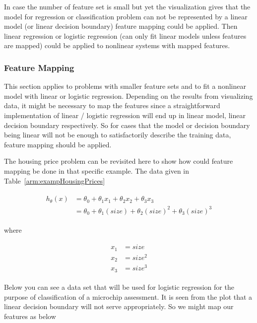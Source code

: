 In case the number of feature set is small but yet the visualization gives that the model for regression or classification problem can not be represented by a linear model (or linear decision boundary) feature mapping could be applied. 
Then linear regression or logistic regression (can only fit linear models unless features are mapped) could be applied to nonlinear systems with mapped features.  

\subsubsection{Feature Mapping}

This section applies to problems with smaller feature sets and to fit a nonlinear model with linear or logistic regression.
Depending on the results from visualizing data, it might be necessary to map the features since a straightforward implementation of linear / logistic regression will end up in linear model, linear decision boundary respectively. 
So for cases that the model or decision boundary being linear will not be enough to satisfactorily describe the training data, feature mapping should be applied.

The housing price problem can be revisited here to show how could feature mapping be done in that specific example.
The data given in Table~\ref{arm:exampHousingPrices} 

\begin{align}
\label{eqn:costFuncExamp1}
\begin{split}
h_{\theta}(x) & = \theta_0 + \theta_1 x_1 + \theta_2 x_2 + \theta_3 x_3
\\
& = \theta_0 + \theta_1 (size) + \theta_2 {(size)}^2 + \theta_3 {(size)}^3
\end{split}
\end{align}

where

\begin{align}
\label{eqn:featureMapping1}
\begin{split}
x_1 & = size
\\
x_2 & = size^2
\\
x_3 & = size^3
\end{split}
\end{align}

Below you can see a data set that will be used for logistic regression 
for the purpose of classification of a microchip assessment. 
It is seen from the plot that a linear decision boundary will 
not serve appropriately. So we might map our features as below

